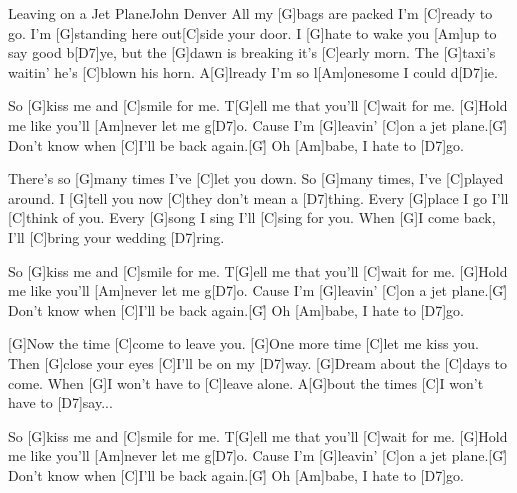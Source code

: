 \documentclass[../main.tex]{subfiles}
\begin{document}
\begin{song}{Leaving on a Jet Plane}{John Denver}{}
All my [G]bags are packed I'm [C]ready to go. I'm [G]standing here out[C]side your door.
I [G]hate to wake you [Am]up to  say good b[D7]ye, but the [G]dawn is breaking it’s [C]early morn.
The [G]taxi's waitin’ he's [C]blown his horn. A[G]lready I'm so l[Am]onesome I could d[D7]ie.

So [G]kiss me and [C]smile for me.
T[G]ell me that you'll [C]wait for me.
[G]Hold me like you'll [Am]never let me g[D7]o.
Cause I'm [G]leavin’ [C]on a jet plane.[G]{\h}
Don't know when [C]I'll be back again.[G]{\h}
Oh [Am]babe, I hate to [D7]go.

There's so [G]many times I've [C]let you down. So [G]many times, I've [C]played around.
I [G]tell you now [C]they don't mean a [D7]thing. Every [G]place I go I'll [C]think of you.
Every [G]song I sing I'll [C]sing for you. When [G]I come back, I'll [C]bring your wedding [D7]ring.

So [G]kiss me and [C]smile for me.
T[G]ell me that you'll [C]wait for me.
[G]Hold me like you'll [Am]never let me g[D7]o.
Cause I'm [G]leavin’ [C]on a jet plane.[G]{\h}
Don't know when [C]I'll be back again.[G]{\h}
Oh [Am]babe, I hate to [D7]go.

[G]Now the time [C]come to leave you. [G]One more time [C]let me kiss you.
Then [G]close your eyes [C]I'll be on my [D7]way. [G]Dream about the [C]days to come.
When [G]I won't have to [C]leave alone. A[G]bout the times [C]I won't have to [D7]say...

So [G]kiss me and [C]smile for me.
T[G]ell me that you'll [C]wait for me.
[G]Hold me like you'll [Am]never let me g[D7]o.
Cause I'm [G]leavin’ [C]on a jet plane.[G]{\h}
Don't know when [C]I'll be back again.[G]{\h}
Oh [Am]babe, I hate to [D7]go.

\end{song}
\end{document}
